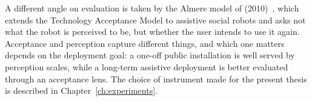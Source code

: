 A different angle on evaluation is taken by the Almere model of  (2010)~\cite{heerink2010almere}, which extends the Technology Acceptance Model to assistive social robots and asks not what the robot is perceived to be, but whether the user intends to use it again.
Acceptance and perception capture different things, and which one matters depends on the deployment goal: a one-off public installation is well served by perception scales, while a long-term assistive deployment is better evaluated through an acceptance lens.
The choice of instrument made for the present thesis is described in Chapter~\ref{ch:experiments}.


